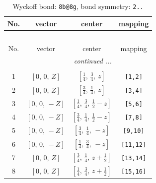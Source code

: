 \documentclass[fleqn,8pt]{jsarticle}
\begin{document}
\begin{longtable}{cccc}
\caption{Wyckoff bond: {\tt 8b@8g}, bond symmetry: {\tt 2..}}
 \\
 \hline \hline
No. & vector & center & mapping \\ \hline \endfirsthead

\multicolumn{3}{l}{\tablename\ \thetable{}} \\
 \hline \hline
No. & vector & center & mapping \\ \hline \endhead

 \hline \hline
\multicolumn{3}{r}{\footnotesize\it continued ...} \\ \endfoot

 \hline \hline
\multicolumn{3}{r}{} \\ \endlastfoot

1 & $\left[ 0,\, 0,\, Z \right]$ & $\left[ \frac{1}{4},\, \frac{3}{4},\, z \right]$ & {\tt [1,2]} \\ \hline
2 & $\left[ 0,\, 0,\, Z \right]$ & $\left[ \frac{3}{4},\, \frac{1}{4},\, z \right]$ & {\tt [3,4]} \\ \hline
3 & $\left[ 0,\, 0,\, - Z \right]$ & $\left[ \frac{1}{4},\, \frac{3}{4},\, \frac{1}{2} - z \right]$ & {\tt [5,6]} \\ \hline
4 & $\left[ 0,\, 0,\, - Z \right]$ & $\left[ \frac{3}{4},\, \frac{1}{4},\, \frac{1}{2} - z \right]$ & {\tt [7,8]} \\ \hline
5 & $\left[ 0,\, 0,\, - Z \right]$ & $\left[ \frac{3}{4},\, \frac{1}{4},\, - z \right]$ & {\tt [9,10]} \\ \hline
6 & $\left[ 0,\, 0,\, - Z \right]$ & $\left[ \frac{1}{4},\, \frac{3}{4},\, - z \right]$ & {\tt [11,12]} \\ \hline
7 & $\left[ 0,\, 0,\, Z \right]$ & $\left[ \frac{3}{4},\, \frac{1}{4},\, z + \frac{1}{2} \right]$ & {\tt [13,14]} \\ \hline
8 & $\left[ 0,\, 0,\, Z \right]$ & $\left[ \frac{1}{4},\, \frac{3}{4},\, z + \frac{1}{2} \right]$ & {\tt [15,16]} \\
\end{longtable}
\renewcommand{\arraystretch}{1.2}
\end{document}
